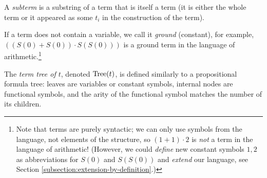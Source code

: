 A \emph{subterm} is a substring of a term that is itself a term (it is either the whole term or it appeared as some $t_i$ in the construction of the term).

If a term does not contain a variable, we call it \emph{ground} (constant), for example, $((S(0)+S(0))\cdot S(S(0)))$ is a ground term in the language of arithmetic.\footnote{Note that terms are purely syntactic; we can only use symbols from the language, not elements of the structure, so $(1+1)\cdot 2$ is \emph{not} a term in the language of arithmetic! (However, we could \emph{define} new constant symbols $1,2$ as abbreviations for $S(0)$ and $S(S(0))$ and \emph{extend} our language, see Section \ref{subsection:extension-by-definition}.)}

The \emph{term tree of $t$}, denoted $\operatorname{Tree}(t)$, is defined similarly to a propositional formula tree: leaves are variables or constant symbols, internal nodes are functional symbols, and the arity of the functional symbol matches the number of its children.


